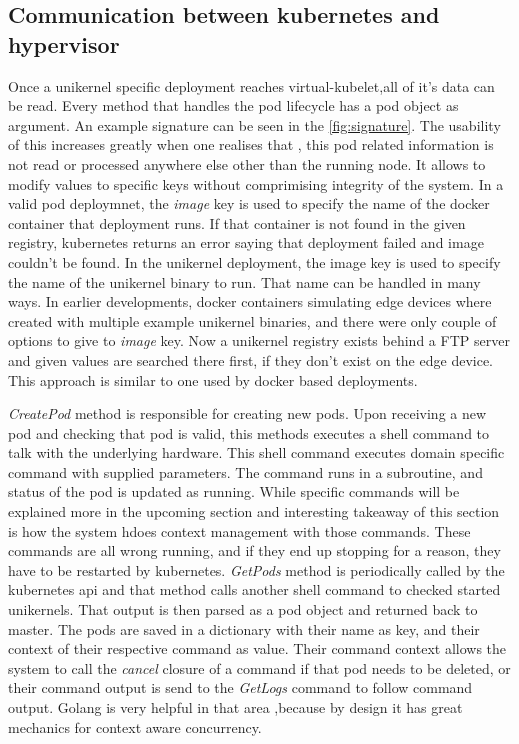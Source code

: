 \subsection{Communication between kubernetes and hypervisor}
Once a unikernel specific deployment reaches virtual-kubelet,all of it's data can be read. Every method that handles the pod lifecycle has a pod object as argument. An example signature can be seen in the \ref{fig:signature}. The usability of this increases greatly when one realises that , this pod related information is not read or processed anywhere else other than the running node. It allows to modify values to specific keys without comprimising integrity of the system. In a valid pod deploymnet, the \textit{image} key is used to specify the name of the docker container that deployment runs. If that container is not found in the given registry, kubernetes returns an error saying that deployment failed and image couldn't be found. In the unikernel deployment, the image key is used to specify the name of the unikernel binary to run. That name can be handled in many ways. In earlier developments, docker containers simulating edge devices where created with multiple example unikernel binaries, and there were only couple of options to give to \textit{image} key. Now a unikernel registry exists behind a FTP server and given values are searched there first, if they don't exist on the edge device. This approach is similar to one used by docker based deployments.

\textit{CreatePod} method is responsible for creating new pods. Upon receiving a new pod and checking that pod is valid, this methods executes a shell command to talk with the underlying hardware. This shell command executes domain specific command with supplied parameters. The command runs in a subroutine, and status of the pod is updated as running. While specific commands will be explained more in the upcoming section and interesting takeaway of this section is how the system hdoes context management with those commands. These commands are all wrong running, and if they end up stopping for a reason, they have to be restarted by kubernetes. \textit{GetPods} method is periodically called by the kubernetes api and that method calls another shell command to checked started unikernels. That output is then parsed as a pod object and returned back to master. The pods are saved in a dictionary with their name as key, and their context of their respective command as value. Their command context allows the system to call the \textit{cancel} closure of a command if that pod needs to be deleted, or their command output is send to the \textit{GetLogs} command to follow command output. Golang is very helpful in that area ,because by design it has great mechanics for context aware concurrency.

